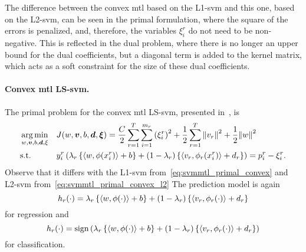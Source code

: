 The difference between the convex \acrshort{mtl} based on the L1-\acrshort{svm} and this one, based on the L2-\acrshort{svm}, can be seen in the primal formulation, where the square of the errors is penalized, and, therefore, the variables $\xi_i^r$ do not need to be non-negative. This is reflected in the dual problem, where there is no longer an upper bound for the dual coefficients, but a diagonal term is added to the kernel matrix, which acts as a soft constraint for the size of these dual coefficients.



\paragraph*{{Convex} \acrshort{mtl} LS-\acrshort{svm}.\\}
The primal problem for the convex \acrshort{mtl} LS-\acrshort{svm}, presented in~\cite{RuizAD21}, is
\begin{equation}\label{eq:svmmtl_primal_convex_ls}
    \begin{aligned}
    & \argmin_{w, \fv{v}, b, \fv{d}, \xi}
    & & {J({w}, \fv{v}, b, \fv{d}, \fv{\xi}) = \frac{C}{2} \sum_{r= 1}^T \sum_{i=1}^{m_r} \left({\xi_{i}^r}\right)^2 + \frac{1}{2} \sum_{r= 1}^T{\norm{{v}_r}^2} + \frac{1}{2} {\norm{{w}}}^2} \\
    & \text{s.t.}
    & & y_{i}^r \left(\lambda_r \left\lbrace \dotp{w}{\phi(x_{i}^r)} + b  \right\rbrace + (1 - \lambda_r) \left\lbrace \dotp{{v}_r}{\phi_r(x_{i}^r)} + d_r \right\rbrace  \right) = p_{i}^r - \xi_{i}^r .  \\
    \end{aligned}
\end{equation}
Observe that it differs with the L1-\acrshort{svm} from~\eqref{eq:svmmtl_primal_convex} and L2-\acrshort{svm} from~\eqref{eq:svmmtl_primal_convex_l2}
The prediction model is again
\begin{equation}
    \nonumber
    h_r(\cdot) = \lambda_r \left\lbrace \left\langle w, \phi(\cdot) \right\rangle + b  \right\rbrace + (1 - \lambda_r) \left\lbrace \left\langle {v}_r, \phi_r(\cdot) \right\rangle + d_r \right\rbrace
\end{equation}
for regression and 
\begin{equation}
    \nonumber
    h_r(\cdot) = \operatorname{sign}{ \left(\lambda_r \left\lbrace \left\langle w, \phi(\cdot) \right\rangle + b  \right\rbrace + (1 - \lambda_r) \left\lbrace \left\langle {v}_r, \phi_r(\cdot) \right\rangle + d_r \right\rbrace \right)}
\end{equation}
for classification.
%

